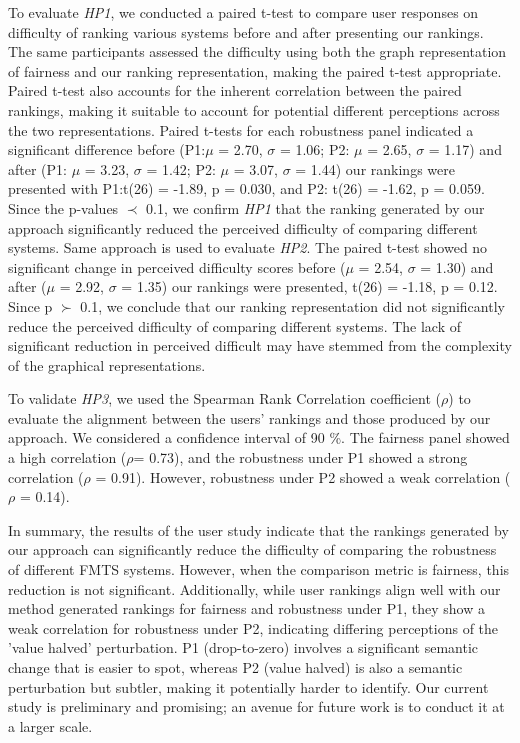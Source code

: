 To evaluate \textit{HP1}, we conducted a paired t-test to compare user responses on difficulty of ranking various systems before and after presenting our rankings. The same participants assessed the difficulty using both the graph representation of fairness and our ranking representation, making the paired t-test appropriate. Paired t-test also accounts for the inherent correlation between the paired rankings, making it suitable to account for potential different perceptions across the two representations. Paired t-tests for each robustness panel indicated a significant difference before (P1:$\mu$ = 2.70, $\sigma$ = 1.06; P2: $\mu$ = 2.65, $\sigma$ = 1.17) and after (P1: $\mu$ = 3.23, $\sigma$ = 1.42; P2: $\mu$ = 3.07, $\sigma$ = 1.44) our rankings were presented with P1:t(26) = -1.89, p = 0.030, and P2: t(26) = -1.62, p = 0.059. Since the p-values $\prec$ 0.1,
we confirm \textit{HP1} that the ranking generated by our approach significantly reduced the perceived difficulty of comparing different systems.
Same approach is used to evaluate \textit{HP2}. The paired t-test showed no significant change in perceived difficulty scores before ($\mu$ = 2.54, $\sigma$ = 1.30) and after ($\mu$ = 2.92, $\sigma$ = 1.35) our rankings were presented, t(26) = -1.18, p = 0.12. Since 
p $\succ$ 0.1,
we conclude that our ranking representation did not significantly reduce the perceived difficulty of comparing different systems. The lack of significant reduction in perceived difficult may have stemmed from the complexity of the graphical representations.
%

To validate \textit{HP3}, we used the Spearman Rank Correlation coefficient \cite{zar2005spearman} ($\rho$) to evaluate the alignment between the users' rankings and those produced by our approach. We considered a confidence interval of 90 \%. The fairness panel showed a high correlation ($\rho$= 0.73), and the robustness under P1 showed a strong correlation ($\rho$ = 0.91). However, robustness under P2 showed a weak correlation ($\rho$ = 0.14).


In summary, the results of the user study indicate that the rankings generated by our approach can significantly reduce the difficulty of comparing the robustness of different FMTS systems. However, when the comparison metric is fairness, this reduction is not significant. Additionally, while user rankings align well with our method generated rankings for fairness and robustness under P1, they show a weak correlation for robustness under P2, indicating differing perceptions of the 'value halved' perturbation.  P1 (drop-to-zero) involves a significant semantic change that is easier to spot, whereas P2 (value halved) is also a semantic perturbation but subtler, making it potentially harder to identify. Our current study is preliminary and promising; an avenue for future work is to conduct it at a larger scale.  

